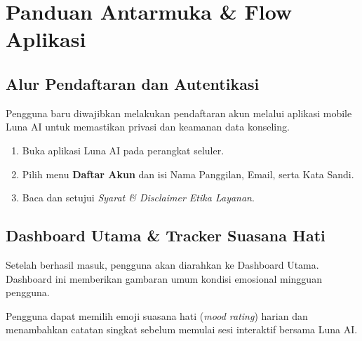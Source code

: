 \chapter{Panduan Antarmuka \& Flow Aplikasi}

\section{Alur Pendaftaran dan Autentikasi}
Pengguna baru diwajibkan melakukan pendaftaran akun melalui aplikasi mobile Luna AI untuk memastikan privasi dan keamanan data konseling.

\begin{enumerate}
    \item Buka aplikasi Luna AI pada perangkat seluler.
    \item Pilih menu \textbf{Daftar Akun} dan isi Nama Panggilan, Email, serta Kata Sandi.
    \item Baca dan setujui \textit{Syarat \& Disclaimer Etika Layanan}.
\end{enumerate}




\section{Dashboard Utama \& Tracker Suasana Hati}
Setelah berhasil masuk, pengguna akan diarahkan ke Dashboard Utama. Dashboard ini memberikan gambaran umum kondisi emosional mingguan pengguna.



\begin{lunanote}
Pengguna dapat memilih emoji suasana hati (\textit{mood rating}) harian dan menambahkan catatan singkat sebelum memulai sesi interaktif bersama Luna AI.
\end{lunanote}


